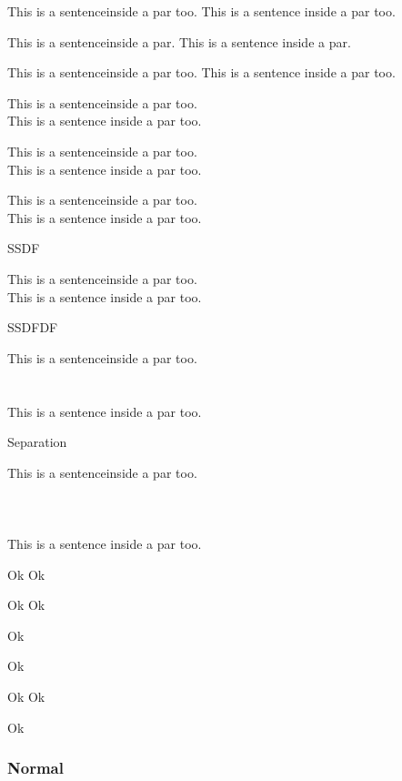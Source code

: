 \documentclass{article}
\begin{document}
This is a sentenceinside a par too. This is a sentence inside a par too.


This is a sentenceinside a par.
This is a sentence inside a par.






This is a sentenceinside a par too. This is a sentence inside a par too.

This is a sentenceinside a par too.\\ This is a sentence inside a par too.

This is a sentenceinside a par too. \\

This is a sentence inside a par too.


This is a sentenceinside a par too. \\



This is a sentence inside a par too.

SSDF

This is a sentenceinside a par too. 
\\
This is a sentence inside a par too.

SSDFDF

This is a sentenceinside a par too. \\ \\ \\
This is a sentence inside a par too.

Separation

This is a sentenceinside a par too. \\ \\ \\ \\
This is a sentence inside a par too.

Ok
\vspace{1cm}
Ok

Ok \vspace{1cm} Ok


Ok

\vspace{1cm}

Ok


Ok \hspace{1cm} Ok

Ok

\subsubsection{Normal}
\end{document}
